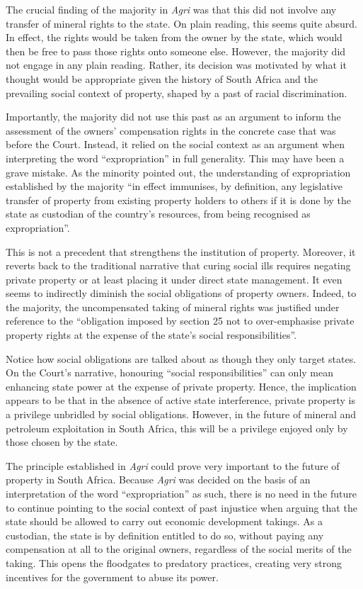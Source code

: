 {The crucial finding of the majority in {\it Agri} was that this did not involve any transfer of mineral rights to the state. On plain reading, this seems quite absurd. In effect, the rights would be taken from the owner by the state, which would then be free to pass those rights onto someone else. However, the majority did not engage in any plain reading. Rather, its decision was motivated by what it thought would be appropriate given the history of South Africa and the prevailing social context of property, shaped by a past of racial discrimination.

Importantly, the majority did not use this past as an argument to inform the assessment of the owners' compensation rights in the concrete case that was before the Court. Instead, it relied on the social context as an argument when interpreting the word ``expropriation'' in full generality. This may have been a grave mistake. As the minority pointed out, the understanding of expropriation established by the majority ``in effect immunises, by definition, any legislative transfer of property from existing property holders to others if it is done by the state as custodian of the country's resources, from being recognised as expropriation''.

This is not a precedent that strengthens the institution of property. Moreover, it reverts back to the traditional narrative that curing social ills requires negating private property or at least placing it under direct state management. It even seems to indirectly diminish the social obligations of property owners. Indeed, to the majority, the uncompensated taking of mineral rights was justified under reference to the ``obligation imposed by section 25 not to over-emphasise private property rights at the expense of the state’s social responsibilities''.

Notice how social obligations are talked about as though they only target states. On the Court's narrative, honouring ``social responsibilities'' can only mean enhancing state power at the expense of private property. Hence, the implication appears to be that in the absence of active state interference, private property is a privilege unbridled by social obligations. However, in the future of mineral and petroleum exploitation in South Africa, this will be a privilege enjoyed only by those chosen by the state.

The principle established in {\it Agri} could prove very important to the future of property in South Africa. Because {\it Agri} was decided on the basis of an interpretation of the word ``expropriation'' as such, there is no need in the future to continue pointing to the social context of past injustice when arguing that the state should be allowed to carry out economic development takings. As a custodian, the state is by definition entitled to do so, without paying any compensation at all to the original owners, regardless of the social merits of the taking. This opens the floodgates to predatory practices, creating very strong incentives for the government to abuse its power.

}
